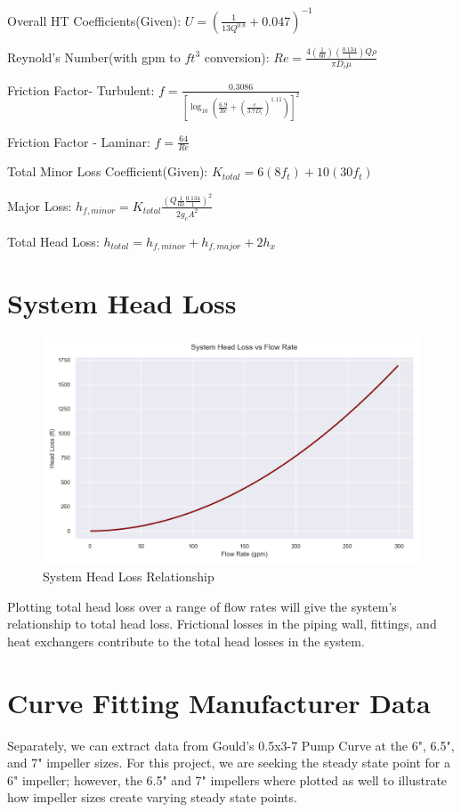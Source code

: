 \documentclass{article}
\begin{document}
Overall HT Coefficients(Given):
$U = \left(\frac{1}{13Q^{0.8}} + 0.047\right)^{-1}$

Reynold's Number(with gpm to $ft^{3}$ conversion):
$Re = \frac{4(\frac{1}{60})(\frac{0.134}{1})Q\rho}{\pi D_i\mu}$

Friction Factor- Turbulent:
$f = \frac{0.3086}{\left[\log_{10}\left(\frac{6.9}{Re} + \left(\frac{\epsilon}{3.7D_i}\right)^{1.11}\right)\right]^2}$

Friction Factor - Laminar:
$f = \frac{64}{Re}$

Total Minor Loss Coefficient(Given):
$K_{total} = 6(8f_t) + 10(30f_t)$

Major Loss:
$h_{f,minor} = K_{total}\frac{\left(Q\frac{1}{60}\frac{0.134}{1}\right)^2}{2g_cA^2}$

Total Head Loss:
$ h_{total} = h_{f,minor} + h_{f,major} + 2h_x $

\section{System Head Loss}

\begin{figure}[!ht]  %
    \centering
    \includegraphics[width=0.75\linewidth]{sns_system_headloss.png}
    \caption{System Head Loss Relationship}
    \label{fig:enter-label}
\end{figure}

Plotting total head loss over a range of flow rates will give the system's relationship to total head loss. Frictional losses in the piping wall, fittings, and heat exchangers contribute to the total head losses in the system.


\section{Curve Fitting Manufacturer Data}
Separately, we can extract data from Gould's 0.5x3-7 Pump Curve at the 6", 6.5", and 7" impeller sizes. For this project, we are seeking the steady state point for a 6" impeller; however, the 6.5" and 7" impellers where plotted as well to illustrate how impeller sizes create varying steady state points.
\end{document}
